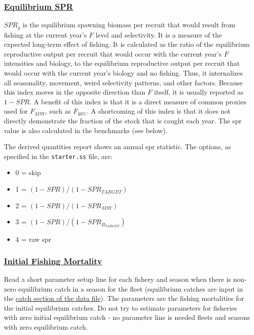 \subsubsection[Equilibrium SPR]{\protect\hyperlink{EquilSPR}{Equilibrium SPR}}
$SPR_y$ is the equilibrium spawning biomass per recruit that would result from fishing at the current year's $F$ level and selectivity. It is a measure of the expected long-term effect of fishing. It is calculated as the ratio of the equilibrium reproductive output per recruit that would occur with the current year's $F$ intensities and biology, to the equilibrium reproductive output per recruit that would occur with the current year's biology and no fishing. Thus, it internalizes all seasonality, movement, weird selectivity patterns, and other factors. Because this index moves in the opposite direction than $F$ itself, it is usually reported as $1-SPR$. A benefit of this index is that it is a direct measure of common proxies used for $F_{MSY}$, such as $F_{40\%}$. A shortcoming of this index is that it does not directly demonstrate the fraction of the stock that is caught each year. The \gls{spr} value is also calculated in the benchmarks (see below). 

The derived quantities report shows an annual \gls{spr} statistic. The options, as specified in the \texttt{starter.ss} file, are:
\begin{itemize}
	\item 0 = skip
	\item 1 = $(1-SPR)/(1-SPR_{TARGET})$
	\item 2 = $(1-SPR)/(1-SPR_{MSY})$
	\item 3 = $(1-SPR)/(1-SPR_{B_{TARGET}})$
	\item 4 = raw \gls{spr}
\end{itemize}

\hypertarget{InitF}{}
\subsubsection[Initial Fishing Mortality]{\protect\hyperlink{InitF}{Initial Fishing Mortality}}
Read a short parameter setup line for each fishery and season when there is non-zero equilibrium catch in a season for the fleet (equilibrium catches are input in the \hyperlink{CatchFormat}{catch section of the data file}). The parameters are the fishing mortalities for the initial equilibrium catches. Do not try to estimate parameters for fisheries with zero initial equilibrium catch - no parameter line is needed fleets and seasons with zero equilibrium catch.

